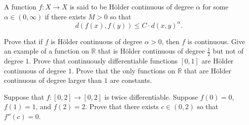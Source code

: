   \begin{exercise}
    A function $f : X \to X$ is said to be Hölder continuous of degree $\alpha$ for some $\alpha \in (0, \infty)$ if there exists $M > 0$ so that
    \begin{equation}
      d(f(x), f(y)) \leq C \cdot d(x, y)^{\alpha}.
    \end{equation}
    
    Prove that if $f$ is Hölder continuous of degree $\alpha > 0$, then $f$ is continuous. Give an example of a function on $\mathbb{R}$ that is Hölder continuous of degree $\frac{1}{2}$ but not of degree $1$. Prove that continuously differentiable functions $[0,1]$ are Hölder continuous of degree $1$. Prove that the only functions on $\mathbb{R}$ that are Hölder continuous of degree larger than $1$ are constants.
  \end{exercise}
  \begin{solution}

  \end{solution}

  \begin{exercise}
    Suppose that $f : [0, 2] \to [0, 2]$ is twice differentiable. Suppose $f(0) = 0$, $f(1) = 1$, and $f(2) = 2$. Prove that there exists $c \in (0, 2)$ so that $f''(c) = 0$.
  \end{exercise}
  \begin{solution}

  \end{solution}

